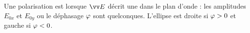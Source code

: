 \documentclass[12pt,fancy]{cours}
\begin{document}
\begin{definition}\label{def:}
  Une polarisation est  lorsque $\E$ décrit une  dans le plan d'onde : les amplitudes $E_{0x}$ et $E_{0y}$ ou le déphasage $\varphi$ sont quelconques. L'ellipse est droite si $\varphi>0$ et gauche si $\varphi<0$.
\end{definition}


%
\end{document}
